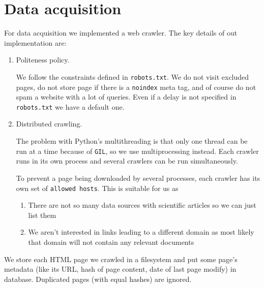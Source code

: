 \section{Data acquisition}
For data acquisition we implemented a web crawler. The key details of out implementation are:
\begin{enumerate}
    \item
        Politeness policy. 
        
        We follow the constraints defined in \texttt{robots.txt}.
        We do not visit excluded pages, do not store page if there is a \texttt{noindex} meta tag, and of course do not spam a website with a lot of queries.
        Even if a delay is not specified in \texttt{robots.txt} we have a default one.

    \item
        Distributed crawling. 
        
        The problem with Python's multithreading is that only one thread can be run at a time because of \texttt{GIL}, so we use multiprocessing instead.
        Each crawler runs in its own process and several crawlers can be run simultaneously. 

        To prevent a page being downloaded by several processes, each crawler has its own set of \texttt{allowed hosts}.
        This is suitable for us as 
        \begin{enumerate}
            \item
                There are not so many data sources with scientific articles so we can just list them
            \item
                We aren't interested in links leading to a different domain as most likely that domain will not contain any relevant documents
        \end{enumerate}

\end{enumerate}

We store each HTML page we crawled in a filesystem and put some page's metadata 
(like its URL, hash of page content, date of last page modify) in database. Duplicated pages (with equal hashes) are ignored.

